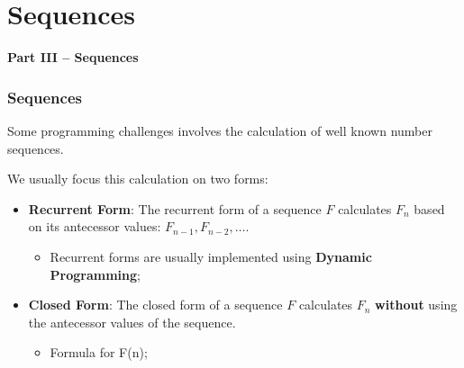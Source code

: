 
\section{Sequences}
\begin{frame}
  \begin{center}
  {\bf Part III -- Sequences}
  \end{center}
\end{frame}

\begin{frame}
  \frametitle{Sequences}
    Some programming challenges involves the calculation of well known number sequences.\bigskip

    We usually focus this calculation on two forms:
    \begin{itemize}
    \item {\bf Recurrent Form}: The recurrent form of a sequence $F$ calculates $F_n$ based on its antecessor values: $F_{n-1}, F_{n-2},\ldots$.
    \begin{itemize}
      \item Recurrent forms are usually implemented using {\bf Dynamic Programming};\bigskip
    \end{itemize}

    \item {\bf Closed Form}: The closed form of a sequence $F$ calculates $F_n$ {\bf without} using the antecessor values of the sequence.
    \begin{itemize}
      \item Formula for F(n);
    \end{itemize}
    \end{itemize}
\end{frame}

